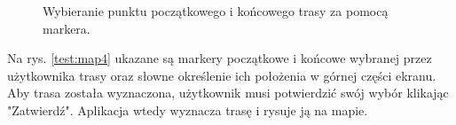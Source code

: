 \setlength{\fboxrule}{0.5pt}
\begin{figure}[H]
    \centering
    \caption{Wybieranie punktu początkowego i końcowego trasy za pomocą markera.}
    \label{test:map3}
\end{figure}

Na rys. \ref{test:map4} ukazane są markery początkowe i końcowe wybranej przez użytkownika trasy oraz słowne określenie ich położenia w górnej części ekranu. Aby trasa została wyznaczona, użytkownik musi potwierdzić swój wybór klikając "Zatwierdź". Aplikacja wtedy wyznacza trasę i rysuje ją na mapie.

